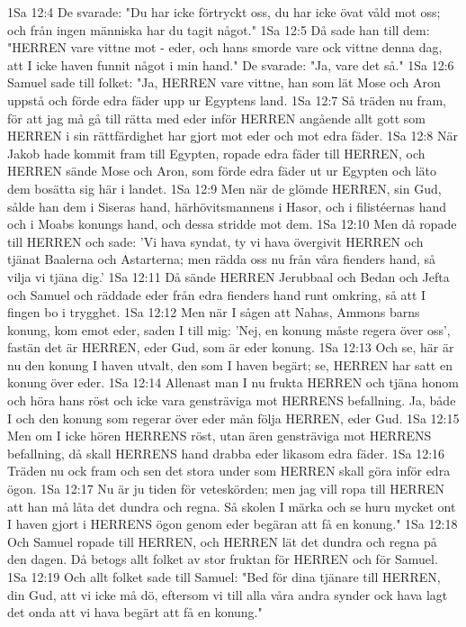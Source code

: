 1Sa 12:4  De svarade: "Du har icke förtryckt oss, du har icke övat våld mot oss; och från ingen människa har du tagit något."
1Sa 12:5  Då sade han till dem: "HERREN vare vittne mot - eder, och hans smorde vare ock vittne denna dag, att I icke haven funnit något i min hand." De svarade: "Ja, vare det så."
1Sa 12:6  Samuel sade till folket: "Ja, HERREN vare vittne, han som lät Mose och Aron uppstå och förde edra fäder upp ur Egyptens land.
1Sa 12:7  Så träden nu fram, för att jag må gå till rätta med eder inför HERREN angående allt gott som HERREN i sin rättfärdighet har gjort mot eder och mot edra fäder.
1Sa 12:8  När Jakob hade kommit fram till Egypten, ropade edra fäder till HERREN, och HERREN sände Mose och Aron, som förde edra fäder ut ur Egypten och läto dem bosätta sig här i landet.
1Sa 12:9  Men när de glömde HERREN, sin Gud, sålde han dem i Siseras hand, härhövitsmannens i Hasor, och i filistéernas hand och i Moabs konungs hand, och dessa stridde mot dem.
1Sa 12:10  Men då ropade till HERREN och sade: 'Vi hava syndat, ty vi hava övergivit HERREN och tjänat Baalerna och Astarterna; men rädda oss nu från våra fienders hand, så vilja vi tjäna dig.'
1Sa 12:11  Då sände HERREN Jerubbaal och Bedan och Jefta och Samuel och räddade eder från edra fienders hand runt omkring, så att I fingen bo i trygghet.
1Sa 12:12  Men när I sågen att Nahas, Ammons barns konung, kom emot eder, saden I till mig: 'Nej, en konung måste regera över oss', fastän det är HERREN, eder Gud, som är eder konung.
1Sa 12:13  Och se, här är nu den konung I haven utvalt, den som I haven begärt; se, HERREN har satt en konung över eder.
1Sa 12:14  Allenast man I nu frukta HERREN och tjäna honom och höra hans röst och icke vara gensträviga mot HERRENS befallning. Ja, både I och den konung som regerar över eder mån följa HERREN, eder Gud.
1Sa 12:15  Men om I icke hören HERRENS röst, utan ären gensträviga mot HERRENS befallning, då skall HERRENS hand drabba eder likasom edra fäder.
1Sa 12:16  Träden nu ock fram och sen det stora under som HERREN skall göra inför edra ögon.
1Sa 12:17  Nu är ju tiden för veteskörden; men jag vill ropa till HERREN att han må låta det dundra och regna. Så skolen I märka och se huru mycket ont I haven gjort i HERRENS ögon genom eder begäran att få en konung."
1Sa 12:18  Och Samuel ropade till HERREN, och HERREN lät det dundra och regna på den dagen. Då betogs allt folket av stor fruktan för HERREN och för Samuel.
1Sa 12:19  Och allt folket sade till Samuel: "Bed för dina tjänare till HERREN, din Gud, att vi icke må dö, eftersom vi till alla våra andra synder ock hava lagt det onda att vi hava begärt att få en konung."
